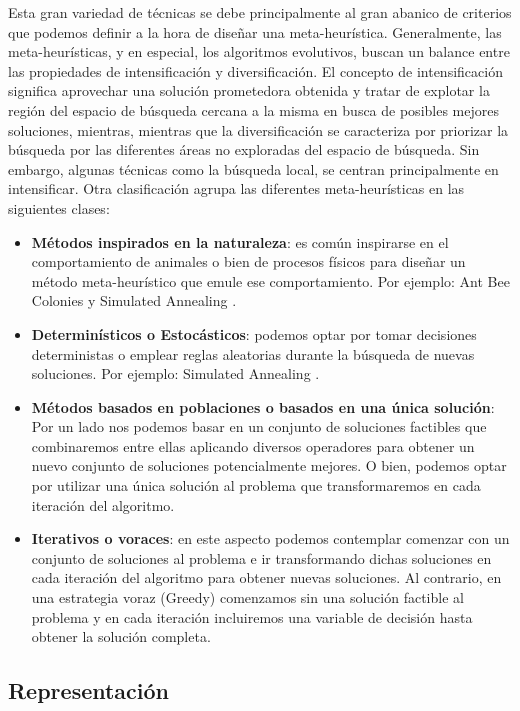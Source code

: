 Esta gran variedad de técnicas se debe principalmente al gran abanico de criterios que podemos definir a la hora de diseñar una meta-heurística. Generalmente, las meta-heurísticas, y en especial, los algoritmos evolutivos, buscan un balance entre las propiedades de intensificación y diversificación. El concepto de intensificación significa aprovechar una solución prometedora  obtenida y tratar de explotar la región del espacio de búsqueda cercana a la misma en busca de posibles mejores soluciones, mientras, mientras que la diversificación se caracteriza por priorizar la búsqueda por las diferentes áreas no exploradas del espacio de búsqueda. Sin embargo, algunas técnicas como la búsqueda local, se centran principalmente en intensificar. Otra clasificación agrupa las diferentes meta-heurísticas en las siguientes clases:

\begin{itemize}
    \item \textbf{Métodos inspirados en la naturaleza}: es común inspirarse en el comportamiento de animales o bien de procesos físicos para diseñar un método meta-heurístico que emule ese comportamiento. Por ejemplo: Ant Bee Colonies \cite{Mann2017} y Simulated Annealing \cite{SA}.
    \item \textbf{Determinísticos o Estocásticos}: podemos optar por tomar decisiones deterministas o emplear reglas aleatorias durante la búsqueda de nuevas soluciones. Por ejemplo: Simulated Annealing \cite{SA1}.
    \item \textbf{Métodos basados en poblaciones o basados en una única solución}: Por un lado nos podemos basar en un conjunto de soluciones factibles que combinaremos entre ellas aplicando diversos operadores para obtener un  nuevo conjunto de soluciones potencialmente mejores. O bien, podemos optar por utilizar una única solución al problema que transformaremos en cada iteración del algoritmo.
    \item \textbf{Iterativos o voraces}: en este aspecto podemos contemplar comenzar con un conjunto de soluciones al problema e ir transformando dichas soluciones en cada iteración del algoritmo para obtener nuevas soluciones. Al contrario, en una estrategia voraz (Greedy) comenzamos sin una solución factible al problema y en cada iteración incluiremos una variable de decisión hasta obtener la solución completa.
\end{itemize}

\subsection{Representación}

